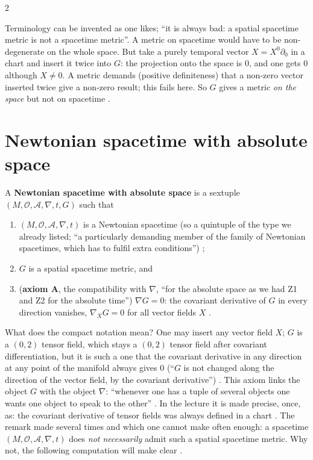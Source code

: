 \begin{paracol}{2}
\begin{coursenote}
Terminology can be invented as one likes; ``it is always bad: a spatial spacetime metric is not a spacetime metric''. A metric on spacetime would have to be non-degenerate on the whole space. But take a purely temporal vector $X=X^0\partial_0$ in a chart and insert it twice into $G$:
the projection onto the space is $0$, and one gets $0$ although $X\ne0$. A metric demands (positive definiteness) that a non-zero vector inserted twice give a non-zero result; this fails here. So $G$ gives a metric \emph{on the space} but not on spacetime
.
\end{coursenote}

\section{Newtonian spacetime with absolute space}\label{sec:as-nrz}

\begin{definition}\label{def:as-nrz-as}
A \textbf{Newtonian spacetime with absolute space} is a sextuple $(M,\mathcal O,\mathcal A,\nabla,t,G)$ such that
\begin{enumerate}
  \item $(M,\mathcal O,\mathcal A,\nabla,t)$ is a Newtonian spacetime (so a quintuple of the type we already listed; ``a particularly demanding member of the family of Newtonian spacetimes, which has to fulfil extra conditions'') ;
  \item $G$ is a spatial spacetime metric, and
  \item (\textbf{axiom A}, the compatibility with $\nabla$, ``for the absolute space as we had Z1 and Z2 for the absolute time'') $\nabla G=0$: the covariant derivative of $G$ in every direction vanishes, $\nabla_XG=0$ for all vector fields $X$
  .
\end{enumerate}
\end{definition}
What does the compact notation mean? One may insert any vector field $X$; $G$ is a $(0,2)$ tensor field, which stays a $(0,2)$ tensor field after covariant differentiation, but it is such a one that the covariant derivative in any direction at any point of the manifold always gives $0$ (``$G$ is not changed along the direction of
the vector field, by the covariant derivative'') . This axiom links the object $G$ with the object $\nabla$: ``whenever one has a tuple of several objects one wants one object to speak to the other'' . In the lecture it is made precise, once, as: the covariant derivative of
tensor fields was always defined in a chart .
The remark made several times and which one cannot make often enough: a spacetime $(M,\mathcal O,\mathcal A,\nabla,t)$ does \emph{not necessarily} admit such a spatial spacetime metric. Why not, the following computation will make clear .


\end{paracol}
